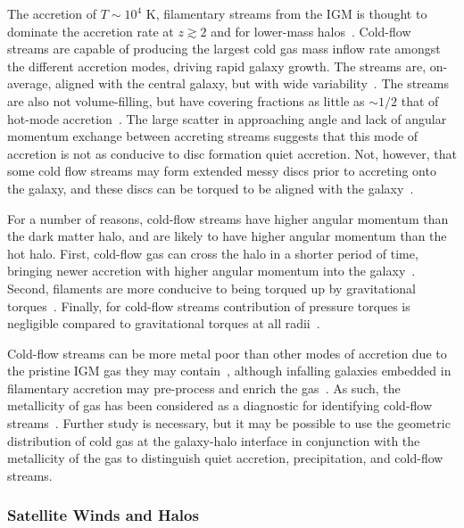 \documentclass[fleqn,usenatbib]{mnras}
\begin{document}
The accretion of $T\sim 10^4$ K, filamentary streams from the IGM is thought to dominate the accretion rate at $z\gtrsim 2$ and for lower-mass halos~\citep[e.g.][]{Keres2005, Keres2009, Dekel2006, Oser2010, VanDeVoort2011a}.
Cold-flow streams are capable of producing the largest cold gas mass inflow rate amongst the different accretion modes, driving rapid galaxy growth.
The streams are, on-average, aligned with the central galaxy, but with wide variability~\citep[e.g.][]{Danovich2012, Stewart2011a, Stewart2013, Stewart2017}.
The streams are also not volume-filling, but have covering fractions as little as $\sim 1/2$ that of hot-mode accretion~\citep[e.g.][]{Wright2021}.
The large scatter in approaching angle and lack of angular momentum exchange between accreting streams suggests that this mode of accretion is not as conducive to disc formation quiet accretion.
Not, however, that some cold flow streams may form extended messy discs prior to accreting onto the galaxy, and these discs can be torqued to be aligned with the galaxy~\cite{Danovich2012, Danovich2015}.

For a number of reasons, cold-flow streams have higher angular momentum than the dark matter halo, and are likely to have higher angular momentum than the hot halo.
First, cold-flow gas can cross the halo in a shorter period of time, bringing newer accretion with higher angular momentum into the galaxy~\citep[e.g.][]{Stewart2013}.
Second, filaments are more conducive to being torqued up by gravitational torques~\citep[e.g.][]{Stewart2013, Danovich2015}.
Finally, for cold-flow streams contribution of pressure torques is negligible compared to gravitational torques at all radii~\citep[e.g.][]{Danovich2015}.

Cold-flow streams can be more metal poor than other modes of accretion due to the pristine IGM gas they may contain~\citep[e.g.][]{Hafen2019, Wright2021}, although infalling galaxies embedded in filamentary accretion may pre-process and enrich the gas~\citep[e.g.][]{Hafen2019}.
As such, the metallicity of gas has been considered as a diagnostic for identifying cold-flow streams~\citep[e.g.][]{Hafen2016}.
Further study is necessary, but it may be possible to use the geometric distribution of cold gas at the galaxy-halo interface in conjunction with the metallicity of the gas to distinguish quiet accretion, precipitation, and cold-flow streams.

\subsubsection{Satellite Winds and Halos}
\label{s: modes -- satellite}
\end{document}
